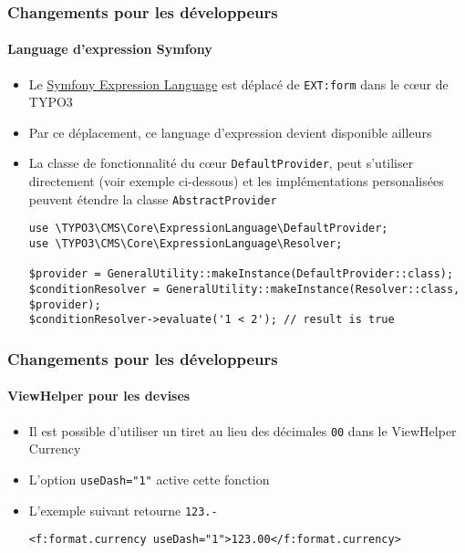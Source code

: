\begin{frame}[fragile]
	\frametitle{Changements pour les développeurs}
	\framesubtitle{Language d'expression Symfony}

	\lstset{basicstyle=\tiny\ttfamily}

	\begin{itemize}
		\item Le \href{https://symfony.com/doc/current/components/expression_language/syntax.html}{Symfony Expression Language}
			est déplacé de \texttt{EXT:form} dans le cœur de TYPO3
		\item Par ce déplacement, ce language d'expression devient disponible ailleurs
		\item La classe de fonctionnalité du cœur \texttt{DefaultProvider}, peut s'utiliser
			directement (voir exemple ci-dessous) et les implémentations personalisées
			peuvent étendre la classe \texttt{AbstractProvider}

			\begin{lstlisting}
use \TYPO3\CMS\Core\ExpressionLanguage\DefaultProvider;
use \TYPO3\CMS\Core\ExpressionLanguage\Resolver;

$provider = GeneralUtility::makeInstance(DefaultProvider::class);
$conditionResolver = GeneralUtility::makeInstance(Resolver::class, $provider);
$conditionResolver->evaluate('1 < 2'); // result is true
			\end{lstlisting}

	\end{itemize}

\end{frame}


\begin{frame}[fragile]
	\frametitle{Changements pour les développeurs}
	\framesubtitle{ViewHelper pour les devises}


	\begin{itemize}
		\item Il est possible d'utiliser un tiret au lieu des décimales \texttt{00}
			dans le ViewHelper Currency
		\item L'option \texttt{useDash="1"} active cette fonction
		\item L'exemple suivant retourne \texttt{123.-}

			\begin{lstlisting}
<f:format.currency useDash="1">123.00</f:format.currency>
			\end{lstlisting}

	\end{itemize}

\end{frame}


